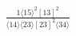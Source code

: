 \documentclass[varwidth, border=5pt]{standalone}
\begin{document}
\begin{my}
$\begin{gathered}
\scriptscriptstyle\frac{1⟨15⟩^2[13]^2}{⟨14⟩⟨23⟩[23]^2⟨34⟩}
\end{gathered}$
\end{my}
\end{document}

